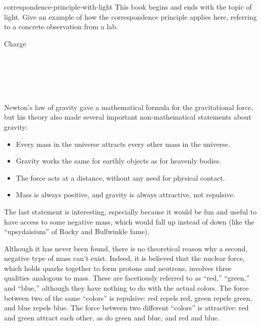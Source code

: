 \begin{hwsection}
\begin{hw}{correspondence-principle-with-light}
This book begins and ends with the topic of light. Give an example
of how the correspondence principle applies here, referring to
a concrete observation from a lab.
\end{hw}
\end{hwsection}

\begin{lab}{Charge}\label{lab:charge}

\apparatus
{}\\
\\
\\
\\


\labintroduction

Newton's law of gravity gave a mathematical formula for the
gravitational force, but his theory also made several
important non-mathematical statements about gravity:

\begin{itemize}
\item[] Every mass in the universe attracts every other mass in the universe.

\item[] Gravity works the same for earthly objects as for heavenly bodies.

\item[] The force acts at a distance, without any need for physical contact.

\item[] Mass is always positive, and gravity is always attractive, not repulsive.
\end{itemize}

The last statement is interesting, especially because it
would be fun and useful to have access to some negative
mass, which would fall up instead of down (like the
``upsydaisium'' of Rocky and Bullwinkle fame).

Although it has never been found, there is no theoretical
reason why a second, negative type of mass can't exist. 
Indeed, it is believed that the nuclear force, which holds
quarks together to form protons and neutrons, involves three
qualities analogous to mass. These are facetiously referred
to as ``red,'' ``green,'' and ``blue,'' although they have
nothing to do with the actual colors. The force between two
of the same ``colors'' is repulsive: red repels red, green
repels green, and blue repels blue. The force between two
different ``colors'' is attractive: red and green attract
each other, as do green and blue, and red and blue.


\end{lab}

